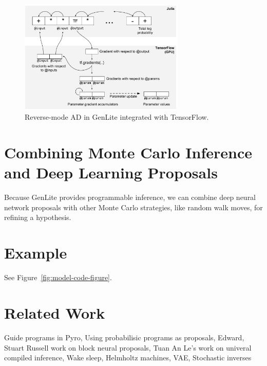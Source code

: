 \documentclass{article}
\begin{document}
\begin{figure}[h]
\centering
    \includegraphics[width=0.7\textwidth]{images/tf-integration-schematic.pdf}
    \caption{Reverse-mode AD in GenLite integrated with TensorFlow.}
    \label{fig:tf-integration-schematic}
\end{figure}

\section{Combining Monte Carlo Inference and Deep Learning Proposals}
Because GenLite provides programmable inference, we can combine deep neural network proposals with other Monte Carlo strategies, like random walk moves, for refining a hypothesis.




\section{Example}
See Figure~\ref{fig:model-code-figure}.

\section{Related Work}
Guide programs in Pyro,
Using probabilisic programs as proposals,
Edward,
Stuart Russell work on block neural proposals,
Tuan An Le's work on univeral compiled inference,
Wake sleep,
Helmholtz machines,
VAE,
Stochastic inverses

%
%
%
%
%
%
%




\end{document}
